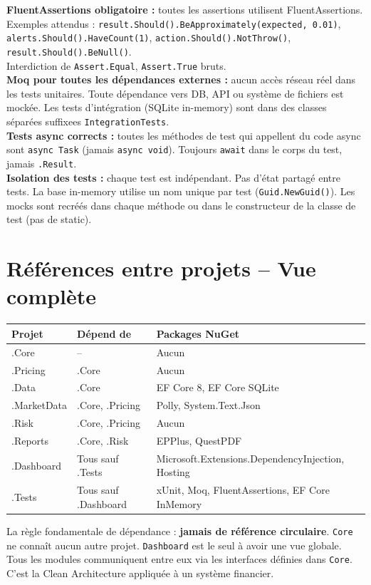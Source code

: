 \documentclass[a4paper,11pt]{article}
\newcommand{\cs}[1]{\texttt{\color{codeinline}#1}}
\begin{document}
\begin{tcolorbox}[constraint]
\textbf{FluentAssertions obligatoire :} toutes les assertions utilisent
FluentAssertions. Exemples attendus :
\cs{result.Should().BeApproximately(expected, 0.01)},
\cs{alerts.Should().HaveCount(1)},
\cs{action.Should().NotThrow()},
\cs{result.Should().BeNull()}. \\
Interdiction de \cs{Assert.Equal}, \cs{Assert.True} bruts. \\[4pt]
\textbf{Moq pour toutes les dépendances externes :} aucun accès réseau
réel dans les tests unitaires. Toute dépendance vers DB, API ou système
de fichiers est mockée. Les tests d'intégration (SQLite in-memory)
sont dans des classes séparées suffixees \cs{IntegrationTests}. \\[4pt]
\textbf{Tests async corrects :} toutes les méthodes de test qui appellent du
code async sont \cs{async Task} (jamais \cs{async void}). Toujours
\cs{await} dans le corps du test, jamais \cs{.Result}. \\[4pt]
\textbf{Isolation des tests :} chaque test est indépendant. Pas d'état
partagé entre tests. La base in-memory utilise un nom unique par test
(\cs{Guid.NewGuid()}). Les mocks sont recréés dans chaque méthode
ou dans le constructeur de la classe de test (pas de static).
\end{tcolorbox}

\newpage
\section{Références entre projets -- Vue complète}

\begin{center}
\begin{tabularx}{\textwidth}{l l X}
\toprule
\textbf{Projet} & \textbf{Dépend de} & \textbf{Packages NuGet} \\
\midrule
.Core & -- & Aucun \\
.Pricing & .Core & Aucun \\
.Data & .Core & EF Core 8, EF Core SQLite \\
.MarketData & .Core, .Pricing & Polly, System.Text.Json \\
.Risk & .Core, .Pricing & Aucun \\
.Reports & .Core, .Risk & EPPlus, QuestPDF \\
.Dashboard & Tous sauf .Tests & Microsoft.Extensions.DependencyInjection, Hosting \\
.Tests & Tous sauf .Dashboard & xUnit, Moq, FluentAssertions, EF Core InMemory \\
\bottomrule
\end{tabularx}
\end{center}

\begin{tcolorbox}[note]
La règle fondamentale de dépendance : \textbf{jamais de référence
circulaire}. \texttt{Core} ne connaît aucun autre projet. \texttt{Dashboard}
est le seul à avoir une vue globale. Tous les modules communiquent entre eux
via les interfaces définies dans \texttt{Core}. C'est la Clean Architecture
appliquée à un système financier.
\end{tcolorbox}
\end{document}
